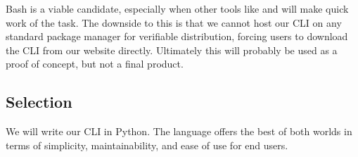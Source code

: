 Bash is a viable candidate, especially when other tools like  and  will make quick work of the task.
The downside to this is that we cannot host our CLI on any standard package manager for verifiable distribution, forcing users to download the CLI from our website directly.
Ultimately this will probably be used as a proof of concept, but not a final product.

\subsection{Selection}

We will write our CLI in Python.
The language offers the best of both worlds in terms of simplicity, maintainability, and ease of use for end users.
